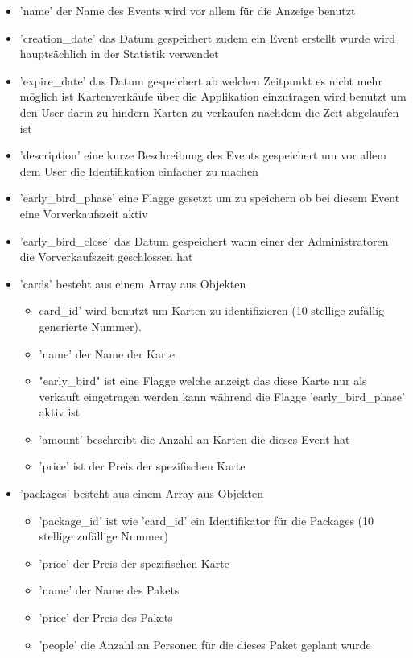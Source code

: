				\begin{itemize}
					\item 'name' der Name des Events wird vor allem für die Anzeige benutzt
					\item 'creation\_date' das Datum gespeichert zudem ein Event erstellt wurde wird hauptsächlich in der Statistik verwendet
					\item 'expire\_date' das Datum gespeichert ab welchen Zeitpunkt es nicht mehr möglich ist Kartenverkäufe über die Applikation einzutragen wird benutzt um den User darin zu hindern Karten zu verkaufen nachdem die Zeit abgelaufen ist
					\item 'description' eine kurze Beschreibung des Events gespeichert um vor allem dem User die Identifikation einfacher zu machen
					\item 'early\_bird\_phase' eine Flagge gesetzt um zu speichern ob bei diesem Event eine Vorverkaufszeit aktiv
					\item 'early\_bird\_close' das Datum gespeichert wann einer der Administratoren die Vorverkaufszeit geschlossen hat
					\item 'cards' besteht aus einem Array aus Objekten
					\begin{itemize}
						\item card\_id' wird benutzt um Karten zu identifizieren (10 stellige zufällig generierte Nummer). 
						\item 'name' der Name der Karte
						\item "early\_bird" ist eine Flagge welche anzeigt das diese Karte nur als verkauft eingetragen werden kann während die Flagge 'early\_bird\_phase' aktiv ist
						\item 'amount' beschreibt die Anzahl an Karten die dieses Event hat
						\item 'price' ist der Preis der spezifischen Karte
					\end{itemize}
					\item 'packages' besteht aus einem Array aus Objekten
					\begin{itemize}
						\item 'package\_id' ist wie 'card\_id' ein Identifikator für die Packages (10 stellige zufällige Nummer)
						\item 'price' der Preis der spezifischen Karte
						\item 'name' der Name des Pakets
						\item 'price' der Preis des Pakets
						\item 'people' die Anzahl an Personen für die dieses Paket geplant wurde

\end{itemize}
\end{itemize}
